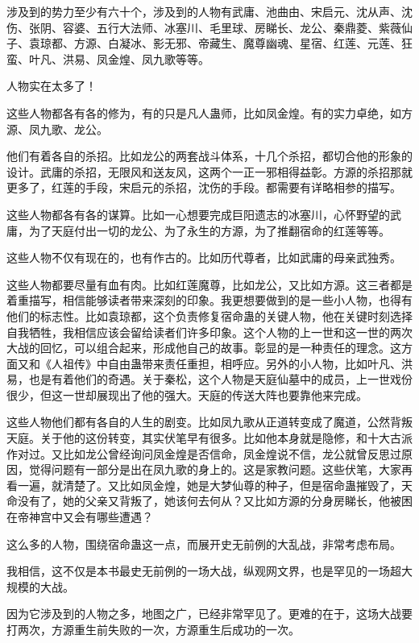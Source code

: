 \begin{this_body}
涉及到的势力至少有六十个，涉及到的人物有武庸、池曲由、宋启元、沈从声、沈伤、张阴、容婆、五行大法师、冰塞川、毛里球、房睇长、龙公、秦鼎菱、紫薇仙子、袁琼都、方源、白凝冰、影无邪、帝藏生、魔尊幽魂、星宿、红莲、元莲、狂蛮、叶凡、洪易、凤金煌、凤九歌等等。

人物实在太多了！

这些人物都各有各的修为，有的只是凡人蛊师，比如凤金煌。有的实力卓绝，如方源、凤九歌、龙公。

他们有着各自的杀招。比如龙公的两套战斗体系，十几个杀招，都切合他的形象的设计。武庸的杀招，无限风和送友风，这两个一正一邪相得益彰。方源的杀招那就更多了，红莲的手段，宋启元的杀招，沈伤的手段。都需要有详略相参的描写。

这些人物都各有各的谋算。比如一心想要完成巨阳遗志的冰塞川，心怀野望的武庸，为了天庭付出一切的龙公、为了永生的方源，为了推翻宿命的红莲等等。

这些人物不仅有现在的，也有作古的。比如历代尊者，比如武庸的母亲武独秀。

这些人物都要尽量有血有肉。比如红莲魔尊，比如龙公，又比如方源。这三者都是着重描写，相信能够读者带来深刻的印象。我更想要做到的是一些小人物，也得有他们的标志性。比如袁琼都，这个负责修复宿命蛊的关键人物，他在关键时刻选择自我牺牲，我相信应该会留给读者们许多印象。这个人物的上一世和这一世的两次大战的回忆，可以组合起来，形成他自己的故事。彰显的是一种责任的理念。这方面又和《人祖传》中自由蛊带来责任重担，相呼应。另外的小人物，比如叶凡、洪易，也是有着他们的奇遇。关于秦松，这个人物是天庭仙墓中的成员，上一世戏份很少，但这一世却展现出了他的强大。天庭的传送大阵也要靠他来完成。

这些人物他们都有各自的人生的剧变。比如凤九歌从正道转变成了魔道，公然背叛天庭。关于他的这份转变，其实伏笔早有很多。比如他本身就是隐修，和十大古派作对过。又比如龙公曾经询问凤金煌是否信命，凤金煌说不信，龙公就曾反思过原因，觉得问题有一部分是出在凤九歌的身上的。这是家教问题。这些伏笔，大家再看一遍，就清楚了。又比如凤金煌，她是大梦仙尊的种子，但是宿命蛊摧毁了，天命没有了，她的父亲又背叛了，她该何去何从？又比如方源的分身房睇长，他被困在帝神宫中又会有哪些遭遇？

这么多的人物，围绕宿命蛊这一点，而展开史无前例的大乱战，非常考虑布局。

我相信，这不仅是本书最史无前例的一场大战，纵观网文界，也是罕见的一场超大规模的大战。

因为它涉及到的人物之多，地图之广，已经非常罕见了。更难的在于，这场大战要打两次，方源重生前失败的一次，方源重生后成功的一次。


\end{this_body}
